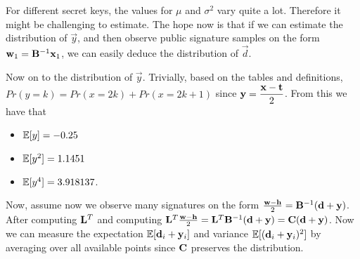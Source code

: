 
For different secret keys, the values for $\mu$ and $\sigma^2$ vary quite a lot.
Therefore it might be challenging to estimate.
The hope now is that if we can estimate the distribution of $\vec{y}$, and then observe public signature samples on the form $\mathbf{w}_1 = \mathbf{B}^{-1} \mathbf{x}_1$, we can easily deduce the distribution of $\vec{d}$.

Now on to the distribution of $\vec{y}$. 
Trivially, based on the tables and definitions, $Pr(y = k) = Pr(x=2k) + Pr(x = 2k + 1)$ since $\vec{y} = \mathlarger{\frac{\vec{x} - \vec{t}}{2}}$.
From this we have that 
\begin{itemize}
    \item $\mathbb{E}[y] = -0.25$
    \item $\mathbb{E}[y^2] = 1.1451$ 
    \item $\mathbb{E}[y^4] = 3.918137$.
\end{itemize}
Now, assume now we observe many signatures on the form $\frac{\mathbf{w} - \mathbf{h}}{2} = \mathbf{B}^{-1}(\mathbf{d} + \mathbf{y})$.
After computing $\mathbf{L}^{T}$ and computing $\mathbf{L}^T \frac{\mathbf{w} - \mathbf{h}}{2} = \mathbf{L}^T \mathbf{B}^{-1}(\mathbf{d} + \mathbf{y}) = \mathbf{C} (\mathbf{d} + \mathbf{y})$.
Now we can measure the expectation $\mathbb{E}[\mathbf{d}_i + \mathbf{y}_i]$ and variance $\mathbb{E}[(\mathbf{d}_i + \mathbf{y}_i )^2]$ by averaging over all available points since $\mathbf{C}$ preserves the distribution.
